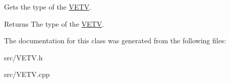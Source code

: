 Gets the type of the \mbox{\hyperlink{class_v_e_t_v}{V\+E\+TV}}. 

\begin{DoxyReturn}{Returns}
The type of the \mbox{\hyperlink{class_v_e_t_v}{V\+E\+TV}}. 
\end{DoxyReturn}


The documentation for this class was generated from the following files\+:\begin{DoxyCompactItemize}
\item 
src/V\+E\+T\+V.\+h\item 
src/V\+E\+T\+V.\+cpp\end{DoxyCompactItemize}

